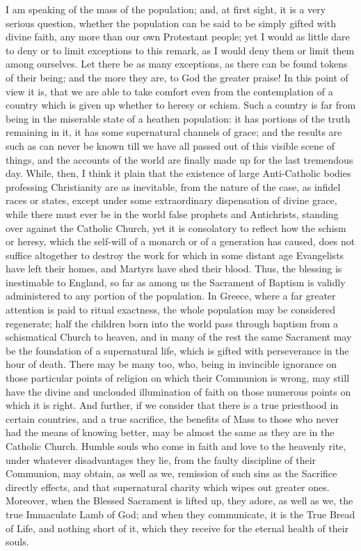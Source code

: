 I am speaking of the mass of the population; and, at first sight,
it is a very serious question, whether the population can be said to
be simply gifted with divine faith, any more than our own Protestant
people; yet I would as little dare to deny or to limit exceptions to
this remark, as I would deny them or limit them among ourselves. Let
there be as many exceptions, as there can be found tokens of their
being; and the more they are, to God the greater praise! In this point
of view it is, that we are able to take comfort even from the
contemplation of a country which is given up whether to heresy or
schism. Such a country is far from being in the miserable state of a
heathen population: it has portions of the truth remaining in it, it
has some supernatural channels of grace; and the results are such as
can never be known till we have all passed out of this visible scene
of things, and the accounts of the world are finally made up for the
last tremendous day. While, then, I think it plain that the existence
of large Anti-Catholic bodies professing Christianity are as
inevitable, from the nature of the case, as infidel races or states,
except under some extraordinary dispensation of divine grace, while
there must ever be in the world false prophets and Antichrists,
standing over against the Catholic Church, yet it is consolatory to
reflect how the schism or heresy, which the self-will of a monarch or
of a generation has caused, does not suffice altogether to destroy the
work for which in some distant age Evangelists have left their homes,
and Martyrs have shed their blood. Thus, the blessing is inestimable
to England, so far as among us the Sacrament of Baptism is validly
administered to any portion of the population. In Greece, where a far
greater attention is paid to ritual exactness, the whole population
may be considered regenerate; half the children born into the world
pass through baptism from a schismatical Church to heaven, and in many
of the rest the same Sacrament may be the foundation of a supernatural
life, which is gifted with perseverance in the hour of death. There
may be many too, who, being in invincible ignorance on those
particular points of religion on which their Communion is wrong, may
still have the divine and unclouded illumination of faith on those
numerous points on which it is right. And further, if we consider that
there is a true priesthood in certain countries, and a true sacrifice,
the benefits of Mass to those who never had the means of knowing
better, may be almost the same as they are in the Catholic Church.
Humble souls who come in faith and love to the heavenly rite, under
whatever disadvantages they lie, from the faulty discipline of their
Communion, may obtain, as well as we, remission of such sins as the
Sacrifice directly effects, and that supernatural charity which wipes
out greater ones. Moreover, when the Blessed Sacrament is lifted up,
they adore, as well as we, the true Immaculate Lamb of God; and when
they communicate, it is the True Bread of Life, and nothing short of
it, which they receive for the eternal health of their souls.

